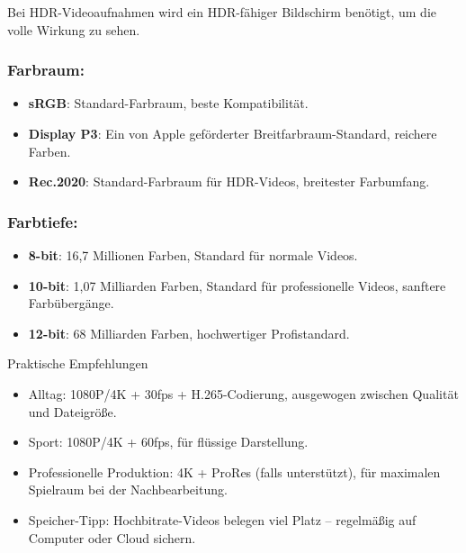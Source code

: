 Bei HDR-Videoaufnahmen wird ein HDR-fähiger Bildschirm benötigt, um die volle Wirkung zu sehen.


\subsubsection*{Farbraum:}

\begin{itemize}
  \item \textbf{sRGB}: Standard-Farbraum, beste Kompatibilität.
  \item \textbf{Display P3}: Ein von Apple geförderter Breitfarbraum-Standard, reichere Farben.
  \item \textbf{Rec.2020}: Standard-Farbraum für HDR-Videos, breitester Farbumfang.
\end{itemize}

\subsubsection*{Farbtiefe:}

\begin{itemize}
  \item \textbf{8-bit}: 16,7 Millionen Farben, Standard für normale Videos.
  \item \textbf{10-bit}: 1,07 Milliarden Farben, Standard für professionelle Videos, sanftere Farbübergänge.
  \item \textbf{12-bit}: 68 Milliarden Farben, hochwertiger Profistandard.
\end{itemize}

\begin{tcbinfo}{Praktische Empfehlungen}
\begin{itemize}
  \item Alltag: 1080P/4K + 30fps + H.265-Codierung, ausgewogen zwischen Qualität und Dateigröße.
  \item Sport: 1080P/4K + 60fps, für flüssige Darstellung.
  \item Professionelle Produktion: 4K + ProRes (falls unterstützt), für maximalen Spielraum bei der Nachbearbeitung.
  \item Speicher-Tipp: Hochbitrate-Videos belegen viel Platz – regelmäßig auf Computer oder Cloud sichern.
\end{itemize}

\end{tcbinfo}

